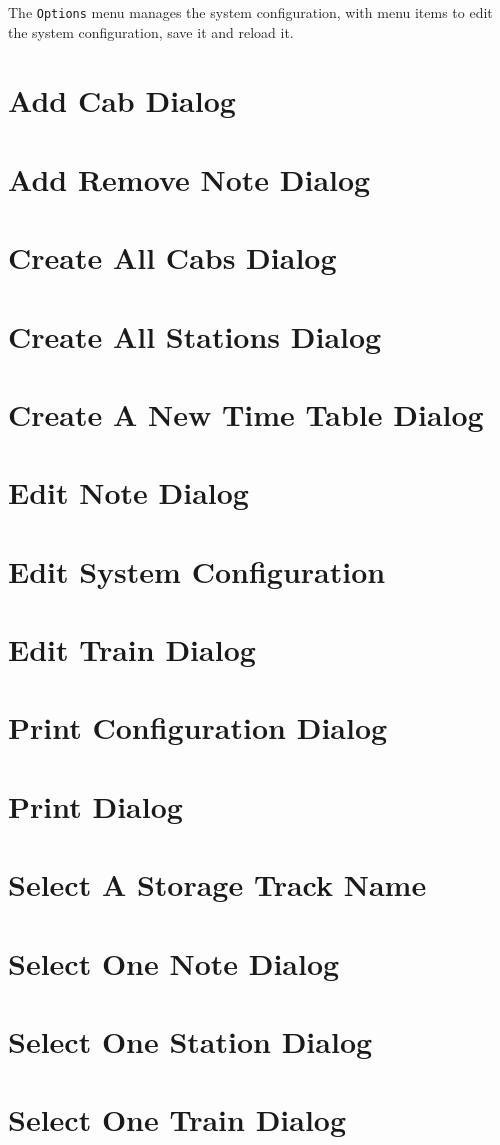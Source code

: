 The \texttt{Options} menu manages the system configuration, with menu
items to edit the system configuration, save it and reload it.

\section{Add Cab Dialog}
\section{Add Remove Note Dialog}
\section{Create All Cabs Dialog}
\section{Create All Stations Dialog}
\section{Create A New Time Table Dialog}
\section{Edit Note Dialog}
\section{Edit System Configuration}
\section{Edit Train Dialog}
\section{Print Configuration Dialog}
\section{Print Dialog}
\section{Select A Storage Track Name}
\section{Select One Note Dialog}
\section{Select One Station Dialog}
\section{Select One Train Dialog}
